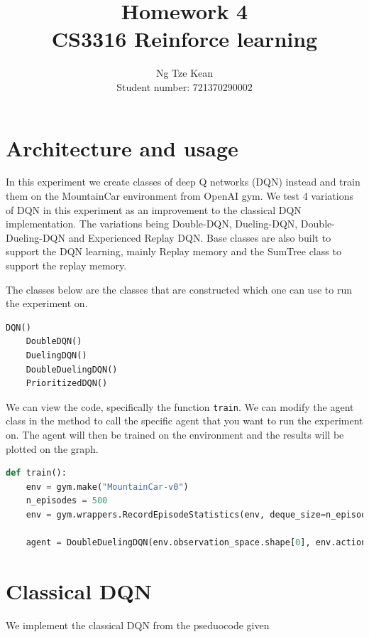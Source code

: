 \documentclass{article}
\title{Homework 4\\CS3316 Reinforce learning}
\author{Ng Tze Kean\\Student number: 721370290002}
\newcommand{\code}[1]{\lstinline|#1|}
\begin{document}
\maketitle

\begin{titlepage}
\end{titlepage}

\section*{Architecture and usage}

In this experiment we create classes of deep Q networks (DQN) instead and train them
on the MountainCar environment from OpenAI gym. We test 4 variations of DQN
in this experiment as an improvement to the classical DQN implementation. The
variations being Double-DQN, Dueling-DQN, Double-Dueling-DQN and Experienced
Replay DQN. Base
classes are also built to support the DQN learning, mainly Replay memory and the
SumTree class to support the replay memory.

The classes below are the classes that are constructed which one can use to run
the experiment on.

\begin{lstlisting}[language=python]
    DQN()
    DoubleDQN()
    DuelingDQN()
    DoubleDuelingDQN()
    PrioritizedDQN()
\end{lstlisting}

We can view the code, specifically the function \code{train}. We can modify
the agent class in the method to call the specific agent that you want to run
the experiment on. The agent will then be trained on the environment and the
results will be plotted on the graph.

\begin{lstlisting}[language=python]
    def train():
    env = gym.make("MountainCar-v0")
    n_episodes = 500
    env = gym.wrappers.RecordEpisodeStatistics(env, deque_size=n_episodes)
    
    agent = DoubleDuelingDQN(env.observation_space.shape[0], env.action_space.n)
\end{lstlisting}

\section*{Classical DQN}

We implement the classical DQN from the pseduocode given
\end{document}
